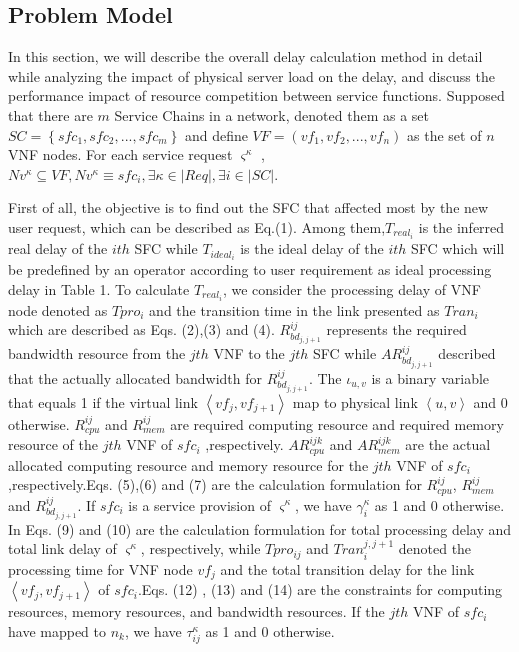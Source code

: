 \documentclass{ieeeaccess}
\begin{document}
\subsection{Problem Model}
In this section, we will describe the overall delay calculation method in detail while analyzing the impact of physical server load on the delay, and discuss the performance impact of resource competition between service functions. Supposed that there are $m$ Service Chains in a network, denoted them as a set $SC=\left \{ sfc_{1},sfc_{2},...,sfc_{m} \right \}$ and define $VF=\left ( vf_{1},vf_{2},...,vf_{n} \right )$ as the  set of $n$ VNF nodes. For each service request ${\varsigma}^{\kappa}$ ,$Nv^{\kappa}\subseteq VF,Nv^{\kappa}\equiv sfc_{i},\exists {\kappa} \in |Req|,\exists i \in |SC|$.

First of all, the objective is to find out the SFC that affected most by the new user request, which can be described as Eq.(1). Among them,$T_{real_{i}}$ is the inferred real delay of the $ith$ SFC while $T_{ideal_{i}}$ is the ideal delay of the ${ith}$ SFC which will be predefined by an operator according to user requirement as ideal processing delay in Table 1. To calculate $T_{real_{i}}$, we consider the processing delay of VNF node denoted as $Tpro_{i}$ and the transition time in the link presented as $Tran_{i}$ which are described as Eqs. (2),(3) and (4). $R_{bd_{j,j+1}}^{ij}$ represents the required bandwidth resource from the $jth$ VNF to the $jth$ SFC while $AR_{bd_{j,j+1}}^{ij}$ described that the actually allocated bandwidth for $R_{bd_{j,j+1}}^{ij}$. The $\iota _{u,v}$ is a binary variable that equals 1 if the virtual link $\left \langle vf_{j},vf_{j+1} \right \rangle$ map to physical link  $\left \langle u,v \right \rangle$ and 0 otherwise.
$R_{cpu}^{ij}$ and $R_{mem}^{ij}$ are required computing resource and required memory resource of the ${jth}$ VNF of ${sfc}_{i}$ ,respectively. $AR_{cpu}^{ijk}$ and $AR_{mem}^{ijk}$ are the actual allocated computing resource and memory resource for the $jth$ VNF of  ${sfc}_{i}$,respectively.Eqs. (5),(6) and (7) are the calculation formulation for $R_{cpu}^{ij}$, $R_{mem}^{ij}$ and $R_{bd_{j,j+1}}^{ij}$. If $sfc_{i}$ is a service provision of ${\varsigma}^{\kappa}$, we have $\gamma _{i}^{\kappa}$ as 1 and 0 otherwise. In Eqs. (9) and (10) are the calculation formulation for total processing delay and total link delay of ${\varsigma}^{\kappa}$, respectively, while $Tpro_{ij}$ and $Tran_{i}^{j,j+1}$ denoted the processing time for VNF node $vf_{j}$ and  the total transition delay for the link $\left \langle vf_{j},vf_{j+1} \right \rangle$ of $sfc_{i}$.Eqs. (12) , (13) and (14)  are the constraints for computing resources, memory resources, and bandwidth resources. If the $jth$  VNF of $sfc_{i}$ have mapped to $n_{k}$, we have $\tau _{ij}^{\kappa}$ as 1 and 0 otherwise.
\end{document}
